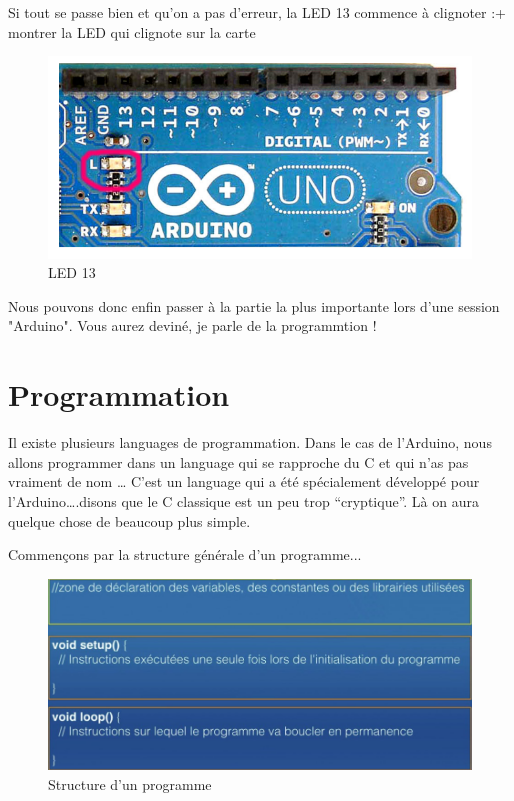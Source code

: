 \documentclass[12pt,a4paper]{article}
\begin{document}
\bigskip
Si tout se passe bien et qu’on a pas d’erreur, la LED 13 commence à clignoter :+ montrer la LED qui clignote sur la carte

\begin{figure}[h!]
    \centering
    \includegraphics[scale=0.5]{led.PNG}
    \caption{LED 13}
    \label{fig:my_label}
\end{figure}

Nous pouvons donc enfin passer à la partie la plus importante lors d'une session "Arduino". Vous aurez deviné, je parle de la programmtion !

\newpage
\section{\LARGE Programmation}
Il existe plusieurs languages de programmation. Dans le cas de l’Arduino, nous allons programmer dans un language qui se rapproche du C et qui n’as pas vraiment de nom … 
C’est un language qui a été spécialement développé pour l’Arduino….disons que le C classique est un peu trop “cryptique”. Là on aura quelque chose de beaucoup plus simple.

\bigskip
Commençons par la structure générale d’un programme...

\begin{figure}[h!]
    \centering
    \includegraphics[scale=0.7]{structprog.PNG}
    \caption{Structure d'un programme}
    \label{fig:my_label}
\end{figure}
\end{document}
